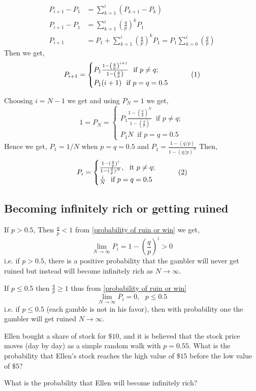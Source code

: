 \begin{align*}
    P_{i+1} -P_{1} &= \sum_{k=1}^{i} (P_{k+1}-P_{k})\\ 
    P_{i+1} -P_{1} &= \sum_{k=1}^{i}\left(\frac{q}{p}\right)^{k}P_{1}  \\
    P_{i+1} &= P_{1} + \sum_{k=1}^{i}\left(\frac{q}{p}\right)^{k}P_{1} =  P_{1}\sum_{k=0}^{i}\left( \frac{q}{p} \right)
\end{align*}
Then we get, 
\[
            P_{i+1}  =  \begin{cases}
                P_{1}\frac{1-\left(\frac{q}{p}\right)^{i+1}}{1-\left(\frac{q}{p}\right)} \ \text{ if } p\neq q;\\ 
                P_{1}(i+1) \ \text{ if } p=q=0.5
            \end{cases} \numberthis
\]

Choosing $ i=N-1 $ we get and using  $ P_{N} =1 $ we get,
\[
    1=P_{N}=
    \begin{cases}
        P_{1}\frac{1-\left(\frac{q}{p}\right)^{N}}{1-\left(\frac{q}{p}\right)} \ \text{ if } p\neq q;\\ 
        P_{1}N \ \text{ if } p=q=0.5
    \end{cases}
\]
Hence we get, $ P_{1} = 1/N $ when $ p=q=0.5 $ and  $ P_{1} = \frac{1-(q/p)}{1-(q/p)^{N}} $ Then,
\[
    P_{i}=
    \begin{cases}
        \frac{1-(\frac{q}{p})^{i}}{1-(\frac{q}{p})^{N}}, \ \text{ it } p\neq q;\\ 
        \frac{i}{N} \ \text{ if } p=q=0.5 
    \end{cases} \numberthis \label{probability of ruin or win}
\]

\subsection{Becoming infinitely rich or getting ruined}
If $ p>0.5 $, Then  $ \frac{q}{p}<1 $ from \cref{probability of ruin or win} we get,
\[
    \lim_{N \to \infty} P_{i} = 1-\left(\frac{q}{p}\right)^{i} >0 
\]
i.e. if $ p>0.5 $, there is a positive probability that the gambler will never get ruined but instead will become infinitely rich as $ N\to \infty $.

If $p\le 0.5$ then $ \frac{q}{p}\ge 1 $ thus from \cref{probability of ruin or win}
\[
    \lim_{N \to \infty} P_{i} = 0, \ \ \ p\le 0.5
\]
i.e. if $p \le 0.5$ (each gamble is not in his favor), then with probability one the gambler will get ruined $ N\to \infty $.

\begin{example}
    Ellen bought a share of stock for $\$10$, and it is believed that the stock price moves (day by day) 
    as a simple random walk with $p = 0.55$. What is the probability that Ellen’s
    stock reaches the high value of $\$15$ before the low value of $\$5$? 

    What is the probability that Ellen will become infinitely rich?
\end{example}

